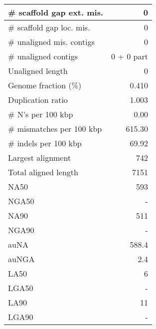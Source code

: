 \documentclass[12pt,a4paper]{article}
\begin{document}
\begin{table}[ht]
\begin{center}
\begin{tabular}{|l*{1}{|r}|}
\# scaffold gap ext. mis. & 0 \\ \hline
\# scaffold gap loc. mis. & 0 \\ \hline
\# unaligned mis. contigs & 0 \\ \hline
\# unaligned contigs & 0 + 0 part \\ \hline
Unaligned length & 0 \\ \hline
Genome fraction (\%) & 0.410 \\ \hline
Duplication ratio & 1.003 \\ \hline
\# N's per 100 kbp & 0.00 \\ \hline
\# mismatches per 100 kbp & 615.30 \\ \hline
\# indels per 100 kbp & 69.92 \\ \hline
Largest alignment & 742 \\ \hline
Total aligned length & 7151 \\ \hline
NA50 & 593 \\ \hline
NGA50 & - \\ \hline
NA90 & 511 \\ \hline
NGA90 & - \\ \hline
auNA & 588.4 \\ \hline
auNGA & 2.4 \\ \hline
LA50 & 6 \\ \hline
LGA50 & - \\ \hline
LA90 & 11 \\ \hline
LGA90 & - \\ \hline
\end{tabular}
\end{center}
\end{table}
\end{document}
